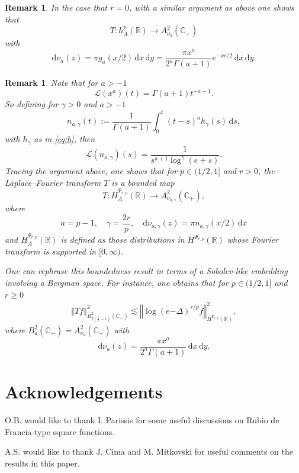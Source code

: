 \documentclass[a4paper, leqno, 10pt]{amsart}
\numberwithin{equation}{section}
\newtheorem{rmk}[thm]{Remark}
\newcommand{\dd}{\mathrm{d}}
\newcommand{\R}{\mathbb{R}}
\newcommand{\norm}[1]{\left\Vert#1\right\Vert}
\newcommand{\brkt}[1]{\left(#1\right)}
\newcommand{\C}{\mathbb{C}}
\begin{document}
\begin{rmk} In the case that $r=0$, with a similar argument as above one shows that 
\[
T: h^p_A(\R)\to A_{\nu_a}^2(\C_+)
\]
with
\[
\dd\nu_{a}(z)=\pi g_{a}(x/2) \,  \dd x\, \dd y=\frac{\pi x^a}{2^a\Gamma(a+1)} e^{-xe/2} \, \dd x \,  \dd y.
\] 
\end{rmk}
\begin{rmk} Note that for $a>-1$ 
\[
\mathcal{L}(x^a)(t)=\Gamma(a+1) t^{-a-1}.
\]
So defining for $\gamma>0$ and $a>-1$
\[
n_{a,\gamma}(t):=\frac{1}{\Gamma(a+1)}\int_0^t (t-s)^a h_{\gamma}(s) \, \dd s,
\]
with $h_\gamma$ as in \eqref{eq:h}, then 
\[
\mathcal{L}(n_{a,\gamma})(s)=\frac{1}{s^{a+1}\log^\gamma(e+s)}.
\]
Tracing the argument above, one shows that for $p \in (1/2, 1]$ and $r>0$,  the Laplace--Fourier transform $T$ is a bounded map 
\[
T: H^{\Psi_{r,p}}_A(\R)\to A^{2}_{\nu_{a,\gamma}}(\C_+),
\] 
where 
\[
a=p-1,\quad \gamma=\frac{2r}{p}, \quad \dd\nu_{a,\gamma}(z)=\pi n_{a,\gamma}(x/2) \, \dd x
\]
and $H^{\Psi_{r,p}}_A(\R)$ is defined  as those distributions in $H^{\Psi_{r,p}}(\R)$ whose Fourier transform is supported in $[0,\infty)$.

One can rephrase this boundedness result in terms of a Sobolev-like embedding involving a Bergman space. For instance, one obtains that for $p \in (1/2, 1]$ and $r\geq 0$
\[
\begin{split}
\norm{Tf}_{B^2_{2(\frac{1}{p}-1)}(\C_+)}^2\lesssim  \norm{\log \brkt{e{{-\Delta}}}^{r/p}f}_{H^{\Psi_{r,p}}(\R)}^2,
\end{split}
\]
where $B^2_a(\C_+)=A_{\nu_a}^2(\C_+)$ with 
\[
\dd \nu_a(z)=\frac{\pi x^a}{2^a\Gamma(a+1)} \,  \dd x \, \dd y.
\]
\end{rmk}
%

\section*{Acknowledgements}
%
O.B. would like to thank I. Parissis for some useful discussions on Rubio de Francia-type square functions.

A.S. would like to thank J. Cima and M. Mitkovski for useful comments on the results in this paper.
\end{document}
